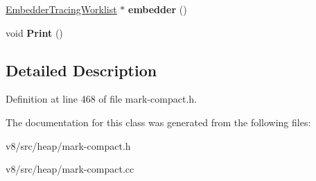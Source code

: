 \begin{DoxyCompactItemize}
\item 
\mbox{\label{classv8_1_1internal_1_1MarkCompactCollector_1_1MarkingWorklist_a44a0891bf98df3d5809398615576538d}} 
\mbox{\hyperlink{classv8_1_1internal_1_1Worklist}{Embedder\+Tracing\+Worklist}} $\ast$ {\bfseries embedder} ()
\item 
\mbox{\label{classv8_1_1internal_1_1MarkCompactCollector_1_1MarkingWorklist_a462aadd69a655dff93b065d5ee7fe324}} 
void {\bfseries Print} ()
\end{DoxyCompactItemize}


\subsection{Detailed Description}


Definition at line 468 of file mark-\/compact.\+h.



The documentation for this class was generated from the following files\+:\begin{DoxyCompactItemize}
\item 
v8/src/heap/mark-\/compact.\+h\item 
v8/src/heap/mark-\/compact.\+cc\end{DoxyCompactItemize}
